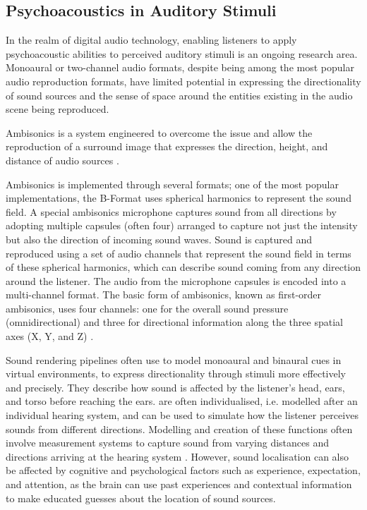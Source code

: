 \subsection{Psychoacoustics in Auditory Stimuli}
In the realm of digital audio technology, enabling listeners to apply psychoacoustic abilities to perceived auditory stimuli is an ongoing research area. Monoaural or two-channel audio formats, despite being among the most popular audio reproduction formats, have limited potential in expressing the directionality of sound sources and the sense of space around the entities existing in the audio scene being reproduced.\par
Ambisonics is a system engineered to overcome the issue and allow the reproduction of a surround image that expresses the direction, height, and distance of audio sources \citep{frank2015producing}.\par
Ambisonics is implemented through several formats; one of the most popular implementations, the B-Format uses spherical harmonics to represent the sound field. 
A special ambisonics microphone captures sound from all directions by adopting multiple capsules (often four) arranged to capture not just the intensity but also the direction of incoming sound waves. Sound is captured and reproduced using a set of audio channels that represent the sound field in terms of these spherical harmonics, which can describe sound coming from any direction around the listener. The audio from the microphone capsules is encoded into a multi-channel format. The basic form of ambisonics, known as first-order ambisonics, uses four channels: one for the overall sound pressure (omnidirectional) and three for directional information along the three spatial axes (X, Y, and Z) \citep{zotter2019ambisonics}.\par
Sound rendering pipelines often use  to model monoaural and binaural cues in virtual environments, to express directionality through stimuli more effectively and precisely. They describe how sound is affected by the listener's head, ears, and torso before reaching the ears.  are often individualised, i.e. modelled after an individual hearing system, and can be used to simulate how the listener perceives sounds from different directions. Modelling and creation of these functions often involve measurement systems to capture sound from varying distances and directions arriving at the hearing system \citep{zotkin2003hrtf}. However, sound localisation can also be affected by cognitive and psychological factors such as experience, expectation, and attention, as the brain can use past experiences and contextual information to make educated guesses about the location of sound sources.\par
